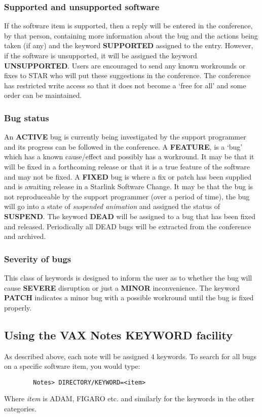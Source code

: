 \subsubsection{Supported and unsupported software}
If the software item is supported, then a reply will be entered in the
conference, by that person, containing more information about the bug and the
actions being taken (if any) and the keyword {\bf SUPPORTED} assigned to the
entry. However, if the software is unsupported, it will
be assigned the keyword {\bf UNSUPPORTED}. Users are encouraged to send any
known workrounds or fixes to STAR who will put these suggestions in the
conference. The conference has restricted write access so that it does not
become a `free for all' and some order can be maintained.
\subsubsection{Bug status}
An {\bf ACTIVE} bug is currently being investigated by the support programmer
and its progress can be followed in the conference. A {\bf FEATURE}, is a `bug'
which has a known cause/effect and possibly has a workround. 
It may be that it will be
fixed in a forthcoming release or that it is a true feature of the software and
may not be fixed. A {\bf FIXED} bug is where a fix or patch has been supplied 
and is awaiting release in a Starlink Software Change. It may be that the bug 
is not reproduceable by the support programmer (over a period of time), the 
bug will go into a state of {\em suspended animation} and assigned the status 
of {\bf SUSPEND}. The keyword {\bf DEAD} will be assigned to a bug that has
been fixed and released. Periodically all DEAD bugs will be extracted from the
conference and archived.
\subsubsection{Severity of bugs}
This class of keywords is designed to inform the user as to whether the bug
will cause {\bf SEVERE} disruption or just a {\bf MINOR} inconvenience. The
keyword {\bf PATCH} indicates a minor bug with a possible workround 
until the bug is fixed properly.
\subsection{Using the VAX Notes KEYWORD facility}
As described above, each note will be assigned 4 keywords. To search for all
bugs on a specific software item, you would type:
\begin{verbatim}
        Notes> DIRECTORY/KEYWORD=<item>  
\end{verbatim}
Where {\em item} is ADAM, FIGARO  etc.
and similarly for the keywords in the other categories.
\newpage
